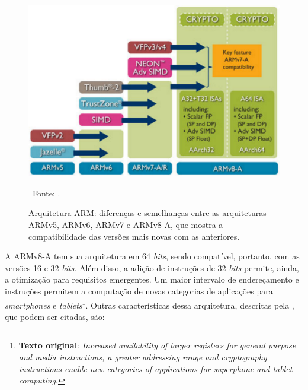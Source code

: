 \begin{figure}[htb]  
	\centering
	\includegraphics[width=.75\textwidth]{figuras/ref_001}
	\caption[Arquitetura ARM]{Arquitetura ARM: diferenças e semelhanças entre as arquiteturas ARMv5, ARMv6, ARMv7 e ARMv8-A, que mostra a compatibilidade das versões mais novas com as anteriores.} 
	\ Fonte: \cite{arm:2017:architecture}. 
	\label{figura:ref_001}
\end{figure}
A ARMv8-A tem sua arquitetura em 64 \textit{bits}, sendo compatível, portanto, com as versões 16 e 32 \textit{bits}. Além disso, a adição de instruções de 32 \textit{bits} permite, ainda, a otimização para requisitos emergentes. Um maior intervalo de endereçamento e instruções permitem a computação de novas categorias de aplicações para \textit{smartphones} e \textit{tablets}\footnote{\textbf{Texto original}: \textit{Increased availability of larger registers for general purpose and media instructions, a greater addressing range and cryptography instructions enable new categories of applications for superphone and tablet computing}.}. Outras características dessa arquitetura, descritas pela \citet{arm:2017:architecture}, que podem ser citadas, são:

